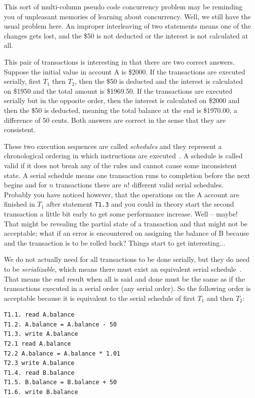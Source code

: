 This sort of multi-column pseudo code concurrency problem may be reminding you of unpleasant memories of learning about concurrency. Well, we still have the usual problem here. An improper interleaving of two statements means one of the changes gets lost, and the \$50 is not deducted or the interest is not calculated at all. 

This pair of transactions is interesting in that there are two correct answers. Suppose the initial value in account A is \$2000. If the transactions are executed serially, first $T_{1}$ then $T_{2}$, then the \$50 is deducted and the interest is calculated on \$1950  and the total amount is \$1969.50. If the transactions are executed serially but in the opposite order, then the interest is calculated on \$2000 and then the \$50 is deducted, meaning the total balance at the end is \$1970.00, a difference of 50 cents. Both answers are correct in the sense that they are consistent.

These two execution sequences are called \textit{schedules} and they represent a chronological ordering in which instructions are executed~\cite{dsc}. A schedule is called valid if it does not break any of the rules and cannot cause some inconsistent state. A serial schedule means one transaction runs to completion before the next begins and for $n$ transactions there are $n!$ different valid serial schedules. Probably you have noticed however, that the operations on the A account are finished in $T_{1}$ after statement \texttt{T1.3} and you could in theory start the second transaction a little bit early to get some performance increase. Well -- maybe! That might be revealing the partial state of a transaction and that might not be acceptable; what if an error is encountered on assigning the balance of B because and the transaction is to be rolled back? Things start to get interesting...

We do not actually need for all transactions to be done serially, but they do need to be \textit{serializable}, which means there must exist an equivalent serial schedule~\cite{dsc}. That means the end result when all is said and done must be the same as if the transactions executed in a serial order (any serial order). So the following order is acceptable because it is equivalent to the serial schedule of first $T_{1}$ and then $T_{2}$:

\begin{verbatim}
T1.1. read A.balance
T1.2. A.balance = A.balance - 50
T1.3. write A.balance
T2.1 read A.balance
T2.2 A.balance = A.balance * 1.01
T2.3 write A.balance
T1.4. read B.balance
T1.5. B.balance = B.balance + 50
T1.6. write B.balance
\end{verbatim}

